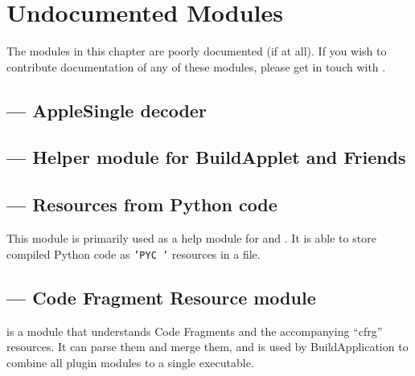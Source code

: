 \chapter{Undocumented Modules \label{undocumented-modules}}


The modules in this chapter are poorly documented (if at all).  If you
wish to contribute documentation of any of these modules, please get in
touch with
.

\localmoduletable


\section{ --- AppleSingle decoder}


\section{ --- Helper module for BuildApplet and Friends}


\section{ --- Resources from Python code}

This module is primarily used as a help module for
 and .  It is able to
store compiled Python code as \texttt{'PYC~'} resources in a file.


\section{ --- Code Fragment Resource module}

 is a module that understands Code Fragments and the
accompanying ``cfrg'' resources. It can parse them and merge them, and is
used by BuildApplication to combine all plugin modules to a single
executable.


